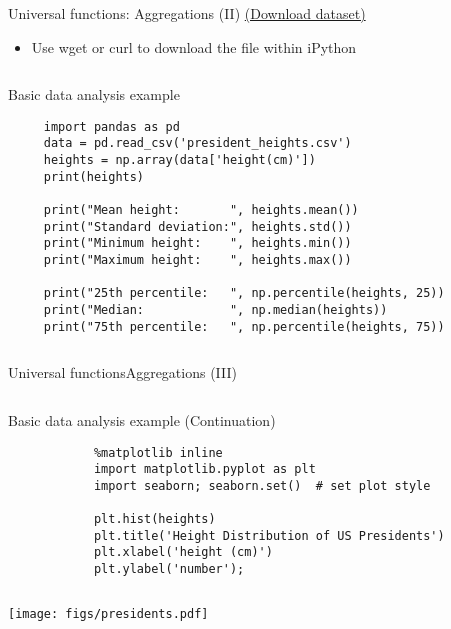 \documentclass[10pt,compress]{beamer} %
\begin{document}
\begin{frame}[fragile]{Universal functions: Aggregations (II)}
	\href{https://raw.githubusercontent.com/jakevdp/PythonDataScienceHandbook/master/notebooks/data/president\_heights.csv}{(Download dataset)}
	\begin{itemize}
		\item Use wget or curl to download the file within iPython
	\end{itemize}
	\vspace{-0.2cm} 
	\begin{columns}
		\begin{exampleblock}{\footnotesize{Basic data analysis example}}
		\vspace{-0.2cm} 
			\begin{lstlisting}
	 import pandas as pd
	 data = pd.read_csv('president_heights.csv')
	 heights = np.array(data['height(cm)'])
	 print(heights)

	 print("Mean height:       ", heights.mean())
	 print("Standard deviation:", heights.std())
	 print("Minimum height:    ", heights.min())
	 print("Maximum height:    ", heights.max())

	 print("25th percentile:   ", np.percentile(heights, 25))
	 print("Median:            ", np.median(heights))
	 print("75th percentile:   ", np.percentile(heights, 75))
			\end{lstlisting}
		\vspace{-0.2cm} 
		\end{exampleblock}
	\end{columns}

\end{frame}

\begin{frame}[fragile]{Universal functions}{Aggregations (III)}
	\vspace{-0.2cm} 
	\begin{columns}
 	   \column{0.9\textwidth}
		\begin{exampleblock}{\footnotesize{Basic data analysis example (Continuation)}}
		\vspace{-0.2cm} 
			\begin{lstlisting}
			%matplotlib inline
			import matplotlib.pyplot as plt
			import seaborn; seaborn.set()  # set plot style

			plt.hist(heights)
			plt.title('Height Distribution of US Presidents')
			plt.xlabel('height (cm)')
			plt.ylabel('number');
			\end{lstlisting}
		\vspace{-0.2cm} 
		\end{exampleblock}
	\end{columns}

	\centering \texttt{[image: figs/presidents.pdf]}	
\end{frame}
\end{document}

